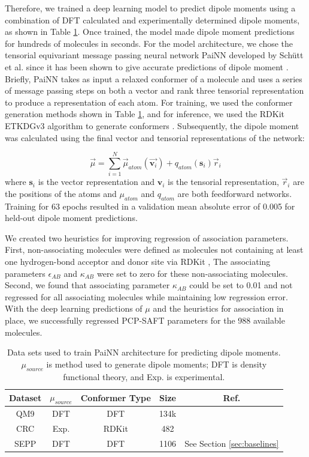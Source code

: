 Therefore, we trained a deep learning model to predict dipole moments using a combination of DFT calculated and experimentally determined dipole moments, as shown in Table \ref{tab:painn_data}. Once trained, the model made dipole moment predictions for hundreds of molecules in seconds. For the model architecture, we chose the tensorial equivariant message passing neural network PaiNN developed by Schütt et al. since it has been shown to give accurate predictions of dipole moment \cite{Schutt2021}. Briefly, PaiNN takes as input a relaxed conformer of a molecule and uses a series of message passing steps on both a vector and rank three tensorial representation to produce a representation of each atom. For training, we used the conformer generation methods shown in Table \ref{tab:painn_data}, and for inference, we used the RDKit ETKDGv3 algorithm to generate conformers \cite{Wang2020}. Subsequently, the dipole moment was calculated using the final vector and tensorial representations of the network:

\begin{equation}
    \vec \mu = \sum_{i=1}^N \vec \mu_{atom}(\vec{\mathbf v_i}) + q_{atom}(\mathbf s_i)\vec r_i
\end{equation}
where $\mathbf s_i$ is the vector representation and $\mathbf v_i$ is the tensorial representation, $\vec r_i$ are the positions of the atoms and $\mu_{atom}$ and $q_{atom}$ are both feedforward networks. Training for 63 epochs resulted in a validation mean absolute error of 0.005 for held-out dipole moment predictions.

We created two heuristics for improving regression of association parameters. First, non-associating molecules were defined as molecules not containing at least one hydrogen-bond acceptor and donor site via RDKit \cite{rdkit}, The associating parameters $\epsilon_{AB}$ and $\kappa_{AB}$ were set to zero for these non-associating molecules. Second, we found that associating parameter $\kappa_{AB}$ could be set to 0.01 and not regressed for all associating molecules while maintaining low regression error. With the deep learning predictions of $\mu$ and the heuristics for association in place, we successfully regressed PCP-SAFT parameters for the 988 available molecules. 

\begin{table}[]
    \centering
    \caption{Data sets used to train PaiNN architecture for predicting dipole moments. $\mu_{source}$ is method used to generate dipole moments; DFT is density functional theory, and Exp. is experimental.}
    \begin{tabular}{ccccc}
         Dataset & $\mu_{source}$ & Conformer Type & Size & Ref.  \\
         \hline
         QM9 & DFT & DFT & 134k & \cite{Ramakrishnan2014}\\
         CRC & Exp. & RDKit\cite{Wang2020} & 482 & \cite{CRC2014} \\
         SEPP & DFT & DFT & 1106 & See Section \ref{sec:baselines}
    \end{tabular}

    \label{tab:painn_data}
\end{table}

